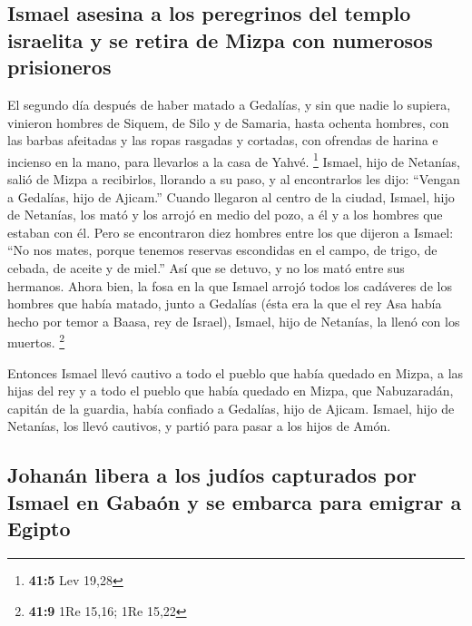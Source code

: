 \hypertarget{ismael-asesina-a-los-peregrinos-del-templo-israelita-y-se-retira-de-mizpa-con-numerosos-prisioneros}{%
\subsection{Ismael asesina a los peregrinos del templo israelita y se
retira de Mizpa con numerosos
prisioneros}\label{ismael-asesina-a-los-peregrinos-del-templo-israelita-y-se-retira-de-mizpa-con-numerosos-prisioneros}}

 El segundo día después de haber matado a Gedalías, y sin
que nadie lo supiera,  vinieron hombres de Siquem, de Silo
y de Samaria, hasta ochenta hombres, con las barbas afeitadas y las
ropas rasgadas y cortadas, con ofrendas de harina e incienso en la mano,
para llevarlos a la casa de Yahvé. \footnote{\textbf{41:5} Lev 19,28}
 Ismael, hijo de Netanías, salió de Mizpa a recibirlos,
llorando a su paso, y al encontrarlos les dijo: ``Vengan a Gedalías,
hijo de Ajicam.''  Cuando llegaron al centro de la ciudad,
Ismael, hijo de Netanías, los mató y los arrojó en medio del pozo, a él
y a los hombres que estaban con él.  Pero se encontraron
diez hombres entre los que dijeron a Ismael: ``No nos mates, porque
tenemos reservas escondidas en el campo, de trigo, de cebada, de aceite
y de miel.'' Así que se detuvo, y no los mató entre sus hermanos.
 Ahora bien, la fosa en la que Ismael arrojó todos los
cadáveres de los hombres que había matado, junto a Gedalías (ésta era la
que el rey Asa había hecho por temor a Baasa, rey de Israel), Ismael,
hijo de Netanías, la llenó con los muertos. \footnote{\textbf{41:9} 1Re
  15,16; 1Re 15,22}

 Entonces Ismael llevó cautivo a todo el pueblo que había
quedado en Mizpa, a las hijas del rey y a todo el pueblo que había
quedado en Mizpa, que Nabuzaradán, capitán de la guardia, había confiado
a Gedalías, hijo de Ajicam. Ismael, hijo de Netanías, los llevó
cautivos, y partió para pasar a los hijos de Amón.

\hypertarget{johanuxe1n-libera-a-los-juduxedos-capturados-por-ismael-en-gabauxf3n-y-se-embarca-para-emigrar-a-egipto}{%
\subsection{Johanán libera a los judíos capturados por Ismael en Gabaón
y se embarca para emigrar a
Egipto}\label{johanuxe1n-libera-a-los-juduxedos-capturados-por-ismael-en-gabauxf3n-y-se-embarca-para-emigrar-a-egipto}}

